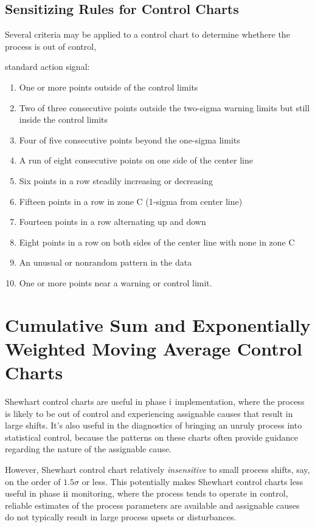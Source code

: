 \documentclass[12pt,oneside,a4paper]{article}
\numberwithin{equation}{section}
\newcommand{\RN}[1]{
	\textup{\uppercase\expandafter{\romannumeral#1}}
}
\begin{document}
\subsection{Sensitizing Rules for Control Charts}
Several criteria may be applied to a control chart to determine whethere the process is out of control, 

standard action signal:
\begin{enumerate}
\item One or more points outside of the control limits 
\item Two of three consecutive points outside the two-sigma warning limits but still inside the control limits
\item Four of five consecutive points beyond the one-sigma limits 
\item A run of eight consecutive points on one side of the center line
\item Six points in a row steadily increasing or decreasing
\item Fifteen points in a row in zone C (1-sigma from center line) 
\item Fourteen points in a row alternating up and down
\item Eight points in a row on both sides of the center line with none in zone C 
\item An unusual or nonrandom pattern in the data 
\item One or more points near a warning or control limit.
\end{enumerate}


\section{Cumulative Sum and Exponentially Weighted Moving Average Control Charts}
Shewhart control charts are useful in phase $\RN{1}$ implementation, where the process is likely to be out of control and experiencing assignable causes that result in large shifts. It's also useful in the diagnostics of bringing an unruly process into statistical control, because the patterns on these charts often provide guidance regarding the nature of the assignable cause. 

However, Shewhart control chart relatively \textit{insensitive} to small process shifts, say, on the order of $1.5 \sigma$ or less. This potentially makes Shewhart control charts less useful in phase $\RN{2}$ monitoring, where the process tends to operate in control, reliable estimates of the process parameters are available and assignable causes do not typically result in large process upsets or disturbances.
\end{document}
